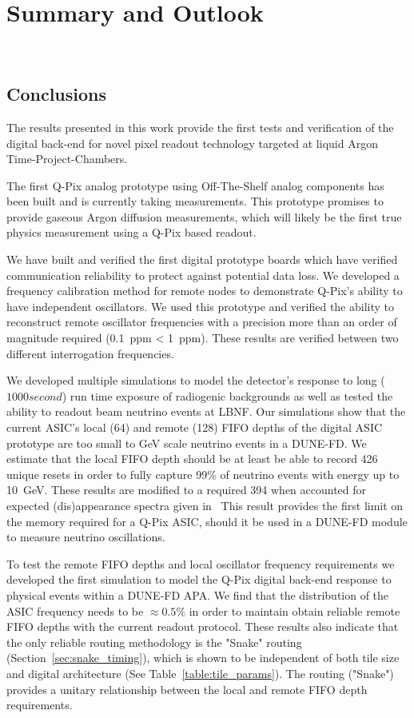 \chapter{Summary and Outlook}~\label{chap:summary}

\section{Conclusions}

The results presented in this work provide the first tests and verification of the digital back-end for novel pixel readout technology targeted at liquid Argon Time-Project-Chambers.

The first Q-Pix analog prototype using Off-The-Shelf analog components has been built and is currently taking measurements.
This prototype promises to provide gaseous Argon diffusion measurements, which will likely be the first true physics measurement using a Q-Pix based readout.

We have built and verified the first digital prototype boards which have verified communication reliability to protect against potential data loss.
We developed a frequency calibration method for remote nodes to demonstrate Q-Pix's ability to have independent oscillators.
We used this prototype and verified the ability to reconstruct remote oscillator frequencies with a precision more than an order of magnitude required (0.1~\unit{ppm} < 1~\unit{ppm}).
These results are verified between two different interrogation frequencies.

We developed multiple simulations to model the detector's response to long ($1000 second$) run time exposure of radiogenic backgrounds as well as tested the ability to readout beam neutrino events at LBNF.
Our simulations show that the current ASIC's local (64) and remote (128) FIFO depths of the digital ASIC prototype are too small to \unit{GeV} scale neutrino events in a DUNE-FD.
We estimate that the local FIFO depth should be at least be able to record 426 unique resets in order to fully capture 99\% of neutrino events with energy up to 10~\unit{GeV}.
These results are modified to a required 394 when accounted for expected (dis)appearance spectra given in~\citep{DUNE_FD_TDRv2_2020}
This result provides the first limit on the memory required for a Q-Pix ASIC, should it be used in a DUNE-FD module to measure neutrino oscillations.

To test the remote FIFO depths and local oscillator frequency requirements we developed the first simulation to model the Q-Pix digital back-end response to physical events within a DUNE-FD APA.
We find that the distribution of the ASIC frequency needs to be $\approx 0.5\%$ in order to maintain obtain reliable remote FIFO depths with the current readout protocol. 
These results also indicate that the only reliable routing methodology is the "Snake" routing (Section~\ref{sec:snake_timing}), which is shown to be independent of both tile size and digital architecture (See Table~\ref{table:tile_params}).
The routing ("Snake") provides a unitary relationship between the local and remote FIFO depth requirements.

